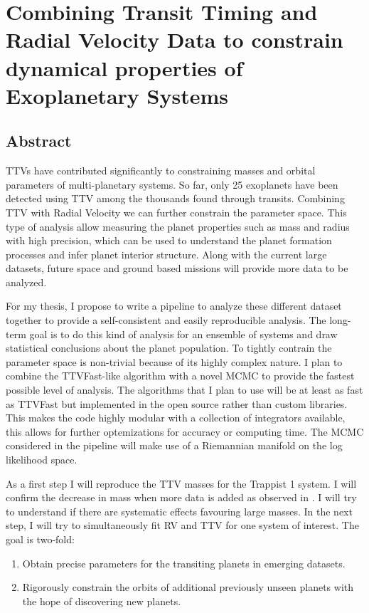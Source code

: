 \section{Combining Transit Timing and Radial Velocity Data to constrain dynamical properties of Exoplanetary Systems}

\subsection{Abstract}
TTVs have contributed significantly to constraining masses and orbital parameters of multi-planetary systems.
So far, only 25 exoplanets have been detected using TTV among the thousands found through transits.
Combining TTV with Radial Velocity we can further constrain the parameter space.
This type of analysis allow  measuring the planet properties such as mass and radius with high precision, which can be used to understand the planet formation processes and infer planet interior structure. 
Along with the current large datasets, future space and ground based missions will provide more data to be analyzed.

For my thesis, I propose to write a pipeline to analyze these different dataset together to provide a self-consistent and easily reproducible analysis. 
The long-term goal is to do this kind of analysis for an ensemble of systems and draw statistical conclusions about the planet population.
To tightly contrain the parameter space is non-trivial because of its highly complex nature.
I plan to combine the TTVFast-like algorithm with a novel MCMC to provide the fastest possible level of analysis.
The algorithms that I plan to use will be at least as fast as TTVFast but implemented in the open source \reb rather than custom libraries.
This makes the code highly modular with a collection of integrators available, this allows for further optemizations for accuracy or computing time.
The MCMC considered in the pipeline will make use of a Riemannian manifold on the log likelihood space.

As a first step I will reproduce the TTV masses for the Trappist 1 system. 
I will confirm the decrease in mass when more data is added as observed in \cite{1704.04290}.
I will try to understand if there are systematic effects favouring large masses.
In the next step, I will try to simultaneously fit RV and TTV for one system of interest. 
The goal is two-fold:
\begin{enumerate} 
	\item Obtain precise parameters for the transiting planets in emerging datasets.
	\item Rigorously constrain the orbits of additional previously unseen planets with the hope of discovering new planets.
\end{enumerate}
